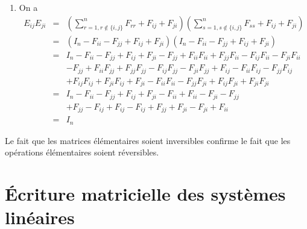 \begin{enumerate}
  \item On a
    \begin{eqnarray*}
      E_{i j}E_{j i} 
        &=& \left( \sum_{r = 1, r \notin \{i, j\}}^{n} F_{r r} + F_{i j} + F_{j i}\right) \left( \sum_{s = 1, s \notin \{i, j\}}^{n} F_{s s}+F_{i j}+F_{j i} \right) \\
        &=& (I_n - F_{i i} - F_{j j} + F_{i j} + F_{j i}) (I_n - F_{i i} - F_{j j} + F_{i j} + F_{j i}) \\
        &=& I_n - F_{i i} - F_{j j} + F_{i j} + F_{j i} - F_{j j} + F_{i i} F_{i i} + F_{j j} F_{i i} - F_{i j} F_{i i} - F_{j i} F_{i i} \\
          && - F_{j j} + F_{i i} F_{j j} + F_{j j} F_{j j} - F_{i j} F_{j j} - F_{j i} F_{j j} + F_{i j} - F_{i i} F_{i j} - F_{j j} F_{i j} \\
          && + F_{i j} F_{i j} + F_{j i} F_{i j} + F_{j i} - F_{i i} F_{i i} - F_{j j} F_{j i} + F_{i j} F_{j i} + F_{j i} F_{j i}\\
        &=& I_n - F_{i i} - F_{j j} + F_{i j} + F_{j i} - F_{i i} + F_{i i} - F_{j i} - F_{j j} \\
          && + F_{j j} - F_{i j} + F_{i j} - F_{i j} + F_{j j} + F_{j i} - F_{j i} + F_{i i} \\
        &=& I_n
    \end{eqnarray*}
\end{enumerate}
Le fait que les matrices élémentaires soient inversibles confirme le fait que les opérations élémentaires soient réversibles.

%
%
\section{Écriture matricielle des systèmes linéaires}
%
%

